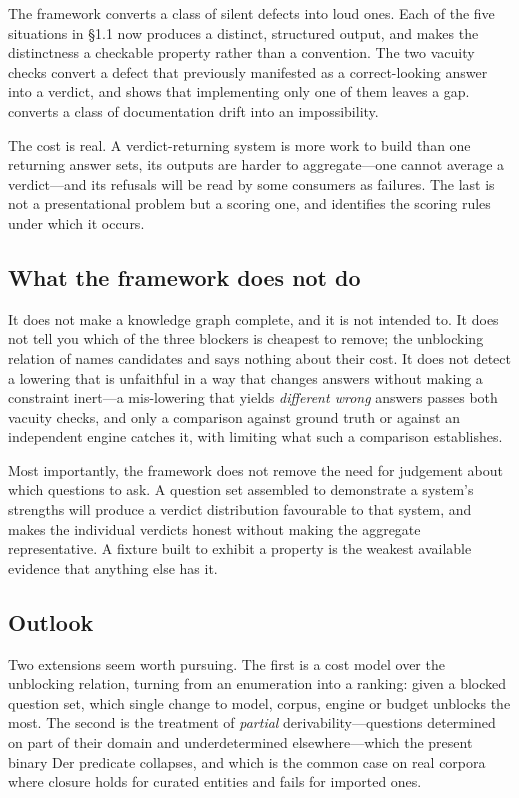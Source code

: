 \documentclass[11pt,a4paper]{article}
\theoremstyle{plain}
\theoremstyle{definition}
\theoremstyle{remark}
\begin{document}
The framework converts a class of silent defects into loud ones. Each of the
five situations in \S1.1 now produces a distinct, structured output, and
 makes the distinctness a checkable property rather
than a convention. The two vacuity checks convert a defect that previously
manifested as a correct-looking answer into a verdict, and
 shows that implementing only one of them leaves a
gap.  converts a class of documentation drift into an
impossibility.

The cost is real. A verdict-returning system is more work to build than one
returning answer sets, its outputs are harder to aggregate---one cannot average
a verdict---and its refusals will be read by some consumers as failures. The
last is not a presentational problem but a scoring one, and
 identifies the scoring rules under which it
occurs.

\subsection{What the framework does not do}

It does not make a knowledge graph complete, and it is not intended to. It does
not tell you which of the three blockers is cheapest to remove; the unblocking
relation of  names candidates and says nothing about
their cost. It does not detect a lowering that is unfaithful in a way that
changes answers without making a constraint inert---a mis-lowering that yields
\emph{different wrong} answers passes both vacuity checks, and only a
comparison against ground truth or against an independent engine catches it,
with  limiting what such a comparison establishes.

Most importantly, the framework does not remove the need for judgement about
which questions to ask. A question set assembled to demonstrate a system's
strengths will produce a verdict distribution favourable to that system, and
 makes the individual verdicts honest without making
the aggregate representative. A fixture built to exhibit a property is the
weakest available evidence that anything else has it.

\subsection{Outlook}

Two extensions seem worth pursuing. The first is a cost model over the
unblocking relation, turning  from an enumeration into a
ranking: given a blocked question set, which single change to model, corpus,
engine or budget unblocks the most. The second is the treatment of
\emph{partial} derivability---questions determined on part of their domain and
underdetermined elsewhere---which the present binary $\mathrm{Der}$ predicate
collapses, and which is the common case on real corpora where closure holds for
curated entities and fails for imported ones.
\end{document}
